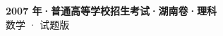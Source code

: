 \documentclass[zihao=-4, a4paper]{ctexart}
\begin{document}
\begin{center}
  {\Large\bfseries 2007 年·普通高等学校招生考试·湖南卷·理科}\\[4pt]
  {\large 数学 · 试题版}
\end{center}
\medskip
{}

\end{document}
